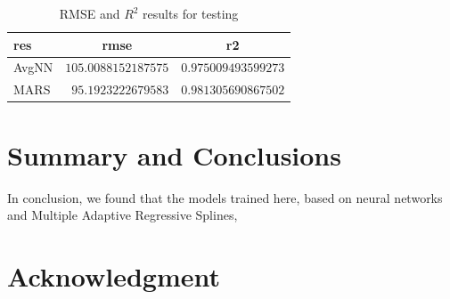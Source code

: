 \documentclass[conference]{IEEEtran}
\begin{document}
\begin{table}[!tbp]
\begin{center}
\begin{tabular}{lrr}
\hline\hline
\multicolumn{1}{l}{res}&\multicolumn{1}{c}{rmse}&\multicolumn{1}{c}{r2}\tabularnewline
\hline
AvgNN&$105.0088152187575$&$0.975009493599273$\tabularnewline
MARS&$ 95.1923222679583$&$0.981305690867502$\tabularnewline
\hline
\end{tabular}\end{center}
\label{tab:res_test}
\caption{RMSE and $R^2$ results for testing}
\end{table}

\section{Summary and Conclusions}
In conclusion, we found that the models trained here, based on neural networks and Multiple Adaptive Regressive Splines, 
\section*{Acknowledgment}






\end{document}
